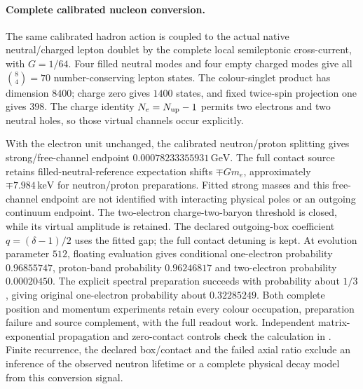 \paragraph{Complete calibrated nucleon conversion.}
The same calibrated hadron action is coupled to the actual native
neutral/charged lepton doublet by the complete local semileptonic
cross-current, with $G=1/64$. Four filled neutral modes and four empty
charged modes give all $\binom84=70$ number-conserving lepton states.
The colour-singlet product has dimension $8400$; charge zero gives
$1400$ states, and fixed twice-spin projection one gives $398$.
The charge identity $N_e=N_{\rm up}-1$ permits two electrons and two
neutral holes, so those virtual channels occur explicitly.

With the electron unit unchanged, the calibrated neutron/proton
splitting gives strong/free-channel endpoint
$0.00078233355931\,\mathrm{GeV}$. The full contact source retains
filled-neutral-reference expectation shifts $\mp Gm_e$, approximately
$\mp7.984\,\mathrm{keV}$ for neutron/proton preparations. Fitted strong
masses and this free-channel endpoint are not identified with interacting
physical poles or an outgoing continuum endpoint.
The two-electron charge-two-baryon threshold is closed, while its virtual
amplitude is retained. The declared outgoing-box coefficient
$q=(\delta-1)/2$ uses the fitted gap; the full contact detuning is kept.
At evolution parameter $512$, floating evaluation gives conditional
one-electron probability $0.96855747$, proton-band probability
$0.96246817$ and two-electron probability $0.00020450$.
The explicit spectral preparation succeeds with probability about
$1/3$, giving original one-electron probability about $0.32285249$.
Both complete position and momentum experiments retain every colour
occupation, preparation failure and source complement, with the full
readout work. Independent matrix-exponential propagation and zero-contact
controls check the calculation in .
Finite recurrence, the declared box/contact and the failed axial ratio
exclude an inference of the observed neutron lifetime or a complete
physical decay model from this conversion signal.
